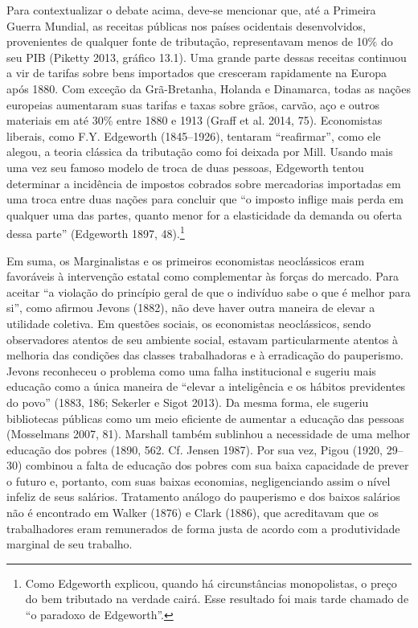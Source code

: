 \documentclass[12pt]{article}
\begin{document}
Para contextualizar o debate acima, deve-se mencionar que, até a Primeira Guerra Mundial, as receitas públicas nos países ocidentais desenvolvidos, provenientes de qualquer fonte de tributação, representavam menos de 10\% do seu PIB (Piketty 2013, gráfico 13.1). Uma grande parte dessas receitas continuou a vir de tarifas sobre bens importados que cresceram rapidamente na Europa após 1880. Com exceção da Grã-Bretanha, Holanda e Dinamarca, todas as nações europeias aumentaram suas tarifas e taxas sobre grãos, carvão, aço e outros materiais em até 30\% entre 1880 e 1913 (Graff et al. 2014, 75). Economistas liberais, como F.Y. Edgeworth (1845–1926), tentaram “reafirmar”, como ele alegou, a teoria clássica da tributação como foi deixada por Mill. Usando mais uma vez seu famoso modelo de troca de duas pessoas, Edgeworth tentou determinar a incidência de impostos cobrados sobre mercadorias importadas em uma troca entre duas nações para concluir que “o imposto inflige mais perda em qualquer uma das partes, quanto menor for a elasticidade da demanda ou oferta dessa parte” (Edgeworth 1897, 48).\footnote{Como Edgeworth explicou, quando há circunstâncias monopolistas, o preço do bem tributado na verdade cairá. Esse resultado foi mais tarde chamado de “o paradoxo de Edgeworth”.}

Em suma, os Marginalistas e os primeiros economistas neoclássicos eram favoráveis à intervenção estatal como complementar às forças do mercado. Para aceitar “a violação do princípio geral de que o indivíduo sabe o que é melhor para si”, como afirmou Jevons (1882), não deve haver outra maneira de elevar a utilidade coletiva. Em questões sociais, os economistas neoclássicos, sendo observadores atentos de seu ambiente social, estavam particularmente atentos à melhoria das condições das classes trabalhadoras e à erradicação do pauperismo. Jevons reconheceu o problema como uma falha institucional e sugeriu mais educação como a única maneira de “elevar a inteligência e os hábitos previdentes do povo” (1883, 186; Sekerler e Sigot 2013). Da mesma forma, ele sugeriu bibliotecas públicas como um meio eficiente de aumentar a educação das pessoas (Mosselmans 2007, 81). Marshall também sublinhou a necessidade de uma melhor educação dos pobres (1890, 562. Cf. Jensen 1987). Por sua vez, Pigou (1920, 29–30) combinou a falta de educação dos pobres com sua baixa capacidade de prever o futuro e, portanto, com suas baixas economias, negligenciando assim o nível infeliz de seus salários. Tratamento análogo do pauperismo e dos baixos salários não é encontrado em Walker (1876) e Clark (1886), que acreditavam que os trabalhadores eram remunerados de forma justa de acordo com a produtividade marginal de seu trabalho.
\end{document}
